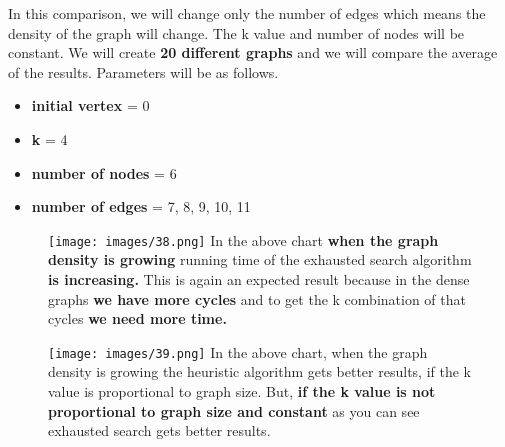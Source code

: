 \documentclass{beamer}
\begin{document}
\begin{projecttimeline2}

In this comparison, we will change only the number of edges which means the density of the graph will change. The k value and number of nodes will be constant. We will create \textbf{20 different graphs} and we will compare the average of the results.
\newline
\newline
Parameters will be as follows.
\vspace{0.03\textheight}
\begin{itemize}
 \item \textbf{initial vertex} = 0 
 \vspace{0.02\textheight}
 \item \textbf{k} = 4
 \vspace{0.02\textheight}
 \item \textbf{number of nodes} = 6
 \vspace{0.02\textheight}
 \item \textbf{number of edges} = 7, 8, 9, 10, 11
\end{itemize}
 
\end{projecttimeline2}

\begin{projecttimeline3}

\begin{figure}
    \texttt{[image: images/38.png]}
    In the above chart\textbf{ when the graph density is growing} running time of the exhausted search algorithm \textbf{is increasing.} This is again an expected result because in the dense graphs \textbf{we have more cycles} and to get the k combination of that cycles \textbf{we need more time.}
\end{figure}
	
\end{projecttimeline3}

\begin{projecttimeline4}

\begin{figure}
		    
    \texttt{[image: images/39.png]}
    In the above chart, when the graph density is growing the heuristic algorithm gets better results, if the k value is proportional to graph size. But, \textbf{if the k value is not proportional to graph size and constant} as you can see exhausted search gets better results.
    
\end{figure}
 
\end{projecttimeline4}
\end{document}
